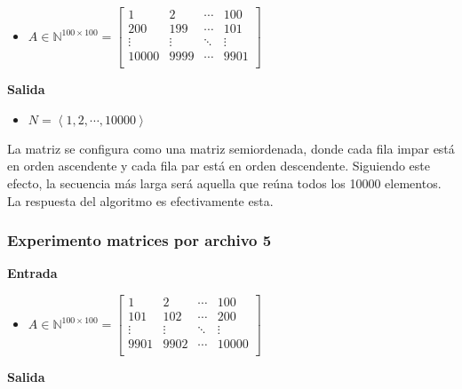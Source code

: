 \documentclass[letter]{article}
\begin{document}
\begin{itemize}
    \item $ A \in \mathbb{N}^{100 \times 100} = 
        \begin{bmatrix}
             1 &      2 & \cdots &    100 \\
           200 &    199 & \cdots &    101 \\
        \vdots & \vdots & \ddots & \vdots \\
         10000 &   9999 & \cdots &   9901 \\
        \end{bmatrix}
    $
\end{itemize}

\textbf{Salida} \par

\begin{itemize}
    \item $N = \left< 1, 2, \cdots, 10000 \right>$
\end{itemize}

La matriz se configura como una matriz semiordenada, donde cada fila impar está en orden ascendente y cada fila par está en orden descendente. Siguiendo este efecto, la secuencia más larga será aquella que reúna todos los 10000 elementos. La respuesta del algoritmo es efectivamente esta. \par

\subsubsection{Experimento matrices por archivo 5}

\textbf{Entrada} \par

\begin{itemize}
    \item $ A \in \mathbb{N}^{100 \times 100} = 
        \begin{bmatrix}
             1 &      2 & \cdots &    100 \\
           101 &    102 & \cdots &    200 \\
        \vdots & \vdots & \ddots & \vdots \\
          9901 &   9902 & \cdots &  10000 \\
        \end{bmatrix}
    $
\end{itemize}

\textbf{Salida} \par
\end{document}
